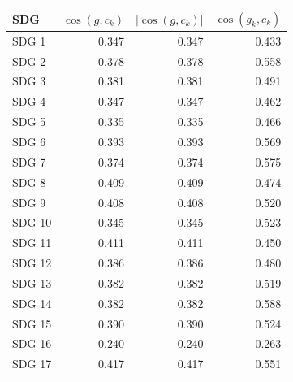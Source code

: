 \begin{tabular}{lrrr}
\toprule
SDG & $\cos(g, c_k)$ & $|\cos(g, c_k)|$ & $\cos(g_k, c_k)$ \\
\midrule
SDG 1 & 0.347 & 0.347 & 0.433 \\
SDG 2 & 0.378 & 0.378 & 0.558 \\
SDG 3 & 0.381 & 0.381 & 0.491 \\
SDG 4 & 0.347 & 0.347 & 0.462 \\
SDG 5 & 0.335 & 0.335 & 0.466 \\
SDG 6 & 0.393 & 0.393 & 0.569 \\
SDG 7 & 0.374 & 0.374 & 0.575 \\
SDG 8 & 0.409 & 0.409 & 0.474 \\
SDG 9 & 0.408 & 0.408 & 0.520 \\
SDG 10 & 0.345 & 0.345 & 0.523 \\
SDG 11 & 0.411 & 0.411 & 0.450 \\
SDG 12 & 0.386 & 0.386 & 0.480 \\
SDG 13 & 0.382 & 0.382 & 0.519 \\
SDG 14 & 0.382 & 0.382 & 0.588 \\
SDG 15 & 0.390 & 0.390 & 0.524 \\
SDG 16 & 0.240 & 0.240 & 0.263 \\
SDG 17 & 0.417 & 0.417 & 0.551 \\
\bottomrule
\end{tabular}
